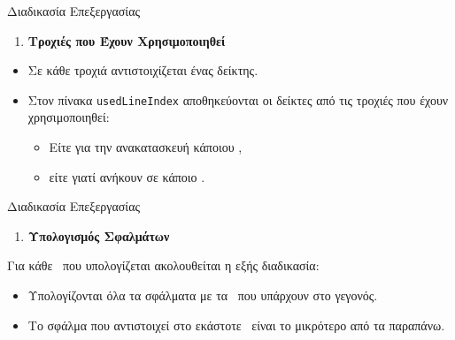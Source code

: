 \beamerdefaultoverlayspecification{<+->}

\begin{frame}{Διαδικασία Επεξεργασίας}
	
	\begin{enumerate}
		\conti
		\item \textbf{Τροχιές που Έχουν Χρησιμοποιηθεί}
		\seti
	\end{enumerate}
	\vspace{4 mm}
	\begin{itemize}
		\item Σε κάθε τροχιά αντιστοιχίζεται ένας δείκτης.
		\item Στον πίνακα \texttt{usedLineIndex} αποθηκεύονται οι δείκτες από τις τροχιές που έχουν χρησιμοποιηθεί:
			\begin{itemize}
				\item Είτε για την ανακατασκευή κάποιου \dvreco,
				\item είτε γιατί ανήκουν σε κάποιο \dvreco.
			\end{itemize}
	\end{itemize}	
\end{frame}

\begin{frame}{Διαδικασία Επεξεργασίας}
	
	\begin{enumerate}
		\conti
		\item \textbf{Υπολογισμός Σφαλμάτων}
		\seti
	\end{enumerate}
	\vspace{4 mm}
	Για κάθε \dvreco\ που υπολογίζεται ακολουθείται η εξής διαδικασία:
	\begin{itemize}
		\item Υπολογίζονται όλα τα σφάλματα με τα \dvtrue\ που υπάρχουν στο γεγονός.
		\item Το σφάλμα που αντιστοιχεί στο εκάστοτε \dvreco\ είναι το μικρότερο από τα παραπάνω.
	\end{itemize}
\end{frame}